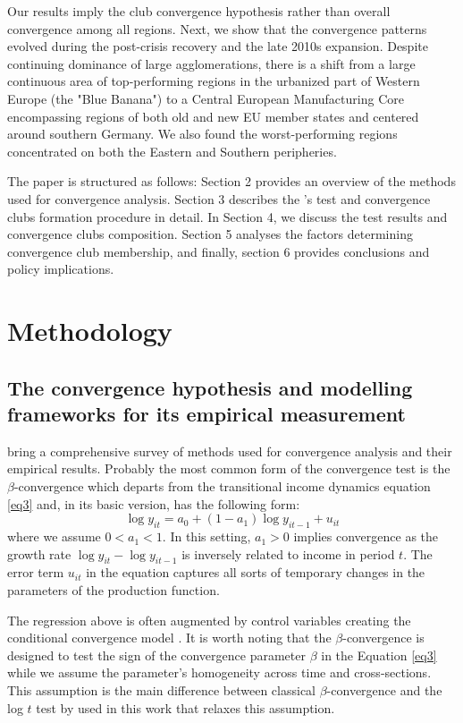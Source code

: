 \documentclass[11pt]{article}
\begin{document}
Our results imply the club convergence hypothesis rather than overall convergence among all regions. Next, we show that the convergence patterns evolved during the post-crisis recovery and the late 2010s expansion. Despite continuing dominance of large agglomerations, there is a shift from a large continuous area of top-performing regions in the urbanized part of Western Europe (the "Blue Banana") to a Central European Manufacturing Core encompassing regions of both old and new EU member states and centered around southern Germany. We also found the worst-performing regions concentrated on both the Eastern and Southern peripheries.


The paper is structured as follows: Section 2 provides an overview of the methods used for convergence analysis. Section 3 describes the \citeauthor{phillips2007transition}'s test and convergence clubs formation procedure in detail. In Section 4, we discuss the test results and convergence clubs composition. Section 5 analyses the factors determining convergence club membership, and finally, section 6 provides conclusions and policy implications.  


\section{Methodology}\label{Methodology}
\subsection{The convergence hypothesis and modelling frameworks for its empirical measurement}

\citet{eckey2007convergence} bring a comprehensive survey of methods used for convergence analysis and their empirical results. Probably the most common form of the convergence test is the $\beta$-convergence which departs from the transitional income dynamics equation \eqref{eq3} and, in its basic version, has the following form:
\begin{equation} \label{eq1}\log y_{it} = a_{0} + (1 - a_{1})\log y_{it-1} + u_{it} \end{equation}
where we assume \(0 < a_{1} < 1\). In this setting, \(a_{1} > 0 \) implies convergence as the growth rate \(\log y_{it} - \log y_{it-1}\) is inversely related to income in period $t$. The error term $u_{it}$ in the equation captures all sorts of temporary changes in the parameters of the production function.

The regression above is often augmented by control variables creating the conditional convergence model \citep{sala1996regional}. It is worth noting that the $\beta$-convergence is designed to test the sign of the convergence parameter $\beta$ in the Equation \ref{eq3} while we assume the parameter's homogeneity across time and cross-sections. This assumption is the main difference between classical  $\beta$-convergence and the log $t$ test by \citet{phillips2007transition} used in this work that relaxes this assumption.
\end{document}
